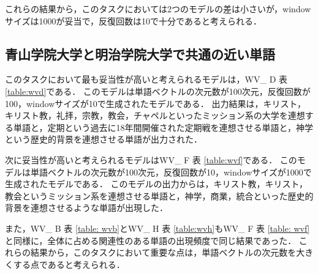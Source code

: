 これらの結果から，このタスクにおいては2つのモデルの差は小さいが，windowサイズは1000が妥当で，反復回数は10で十分であると考えられる．

\subsection{青山学院大学と明治学院大学で共通の近い単語}
このタスクにおいて最も妥当性が高いと考えられるモデルは，WV\_ D 表 \ref{table:wvd}である．
このモデルは単語ベクトルの次元数が100次元，反復回数が100，windowサイズが10で生成されたモデルである．
出力結果は，キリスト，キリスト教，礼拝，宗教，教会，チャペルといったミッション系の大学を連想する単語と，定期という過去に18年間開催された定期戦を連想させる単語と，神学という歴史的背景を連想させる単語が出力された．

次に妥当性が高いと考えられるモデルはWV\_ F 表 \ref{table:wvf}である．
このモデルは単語ベクトルの次元数が100次元，反復回数が10，windowサイズが1000で生成されたモデルである．
このモデルの出力からは，キリスト教，キリスト，教会というミッション系を連想させる単語と，神学，商業，統合といった歴史的背景を連想させるような単語が出現した．

また，WV\_ B 表 \ref{table: wvb}とWV\_ H 表 \ref{table:wvh}もWV\_ F 表 \ref{table: wvf}と同様に，全体に占める関連性のある単語の出現頻度で同じ結果であった．
これらの結果から，このタスクにおいて重要な点は，単語ベクトルの次元数を大きくする点であると考えられる．


